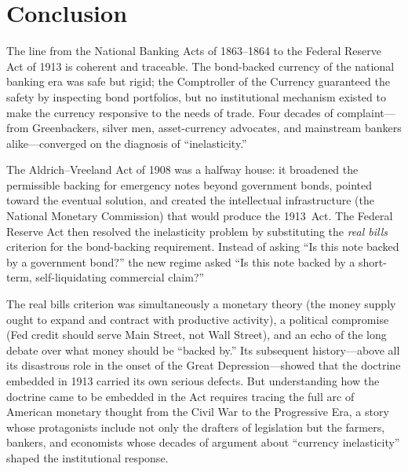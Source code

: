 \documentclass[12pt]{article}
\begin{document}
\section{Conclusion}
\label{sec:conclusion}

The line from the National Banking Acts of 1863--1864 to the Federal Reserve Act
of 1913 is coherent and traceable.  The bond-backed currency of the national
banking era was safe but rigid; the Comptroller of the Currency guaranteed the safety
by inspecting bond portfolios, but no institutional mechanism existed to make
the currency responsive to the needs of trade.  Four decades of complaint---from
Greenbackers, silver men, asset-currency advocates, and mainstream bankers
alike---converged on the diagnosis of ``inelasticity.''

The Aldrich--Vreeland Act of 1908 was a halfway house: it broadened the
permissible backing for emergency notes beyond government bonds, pointed toward the
eventual solution, and created the intellectual infrastructure (the National Monetary
Commission) that would produce the 1913~Act.  The Federal Reserve Act then
resolved the inelasticity problem by substituting the \emph{real bills} criterion for
the bond-backing requirement.  Instead of asking ``Is this note backed by a government
bond?'' the new regime asked ``Is this note backed by a short-term, self-liquidating
commercial claim?''

The real bills criterion was simultaneously a monetary theory (the money supply
ought to expand and contract with productive activity), a political compromise
(Fed credit should serve Main Street, not Wall Street), and an echo of the long
debate over what money should be ``backed by.''  Its subsequent history---above all
its disastrous role in the onset of the Great Depression---showed that the doctrine
embedded in 1913 carried its own serious defects.  But understanding how the
doctrine came to be embedded in the Act requires tracing the full arc of American
monetary thought from the Civil War to the Progressive Era, a story whose
protagonists include not only the drafters of legislation but the farmers, bankers,
and economists whose decades of argument about ``currency inelasticity'' shaped the
institutional response.
\end{document}
